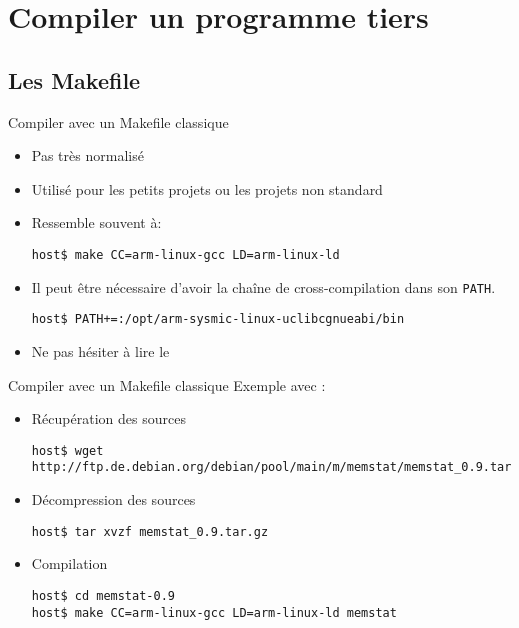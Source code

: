 \section{Compiler un programme tiers}

\subsection{Les Makefile}

\begin{frame}[fragile=singleslide]{Compiler avec un Makefile classique}
  \begin{itemize}
  \item Pas très normalisé
  \item Utilisé pour les petits projets ou les projets non standard
  \item Ressemble souvent à:
    \begin{lstlisting}
host$ make CC=arm-linux-gcc LD=arm-linux-ld
    \end{lstlisting} %
  \item Il peut être nécessaire d'avoir la chaîne de cross-compilation
    dans son \verb+PATH+.
    \begin{lstlisting}
host$ PATH+=:/opt/arm-sysmic-linux-uclibcgnueabi/bin
    \end{lstlisting} %
  \item Ne pas hésiter à lire le 
  \end{itemize}
\end{frame}

\begin{frame}[fragile=singleslide]{Compiler avec un Makefile classique}
  Exemple avec :
  \begin{itemize}
  \item Récupération des sources
    \begin{lstlisting}
host$ wget http://ftp.de.debian.org/debian/pool/main/m/memstat/memstat_0.9.tar.gz
    \end{lstlisting}
  \item Décompression des sources
\begin{lstlisting}
host$ tar xvzf memstat_0.9.tar.gz
\end{lstlisting}
  \item Compilation
\begin{lstlisting}
host$ cd memstat-0.9
host$ make CC=arm-linux-gcc LD=arm-linux-ld memstat
\end{lstlisting} %
  \end{itemize}
\end{frame}

